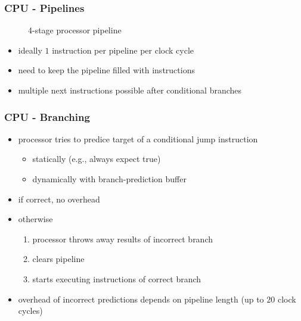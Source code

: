 \begin{frame}
 \frametitle{CPU - Pipelines}

 \begin{figure}
  \caption{4-stage processor pipeline}
 \end{figure}

 \begin{itemize}
  \item ideally \( 1 \) instruction per pipeline per clock cycle
  \item need to keep the pipeline filled with instructions
  \item multiple next instructions possible after conditional branches
 \end{itemize}
\end{frame}

\begin{frame}
 \frametitle{CPU - Branching}
 \begin{itemize}
  \item processor tries to predice target of a conditional jump instruction
   \begin{itemize}
    \item statically (e.g., always expect true)
    \item dynamically with branch-prediction buffer
   \end{itemize}
  \item if correct, no overhead
  \item otherwise
  \begin{enumerate}
   \item processor throws away results of incorrect branch
   \item clears pipeline
   \item starts executing instructions of correct branch
  \end{enumerate}
  \item overhead of incorrect predictions depends on pipeline length (up to \( 20 \) clock cycles)
 \end{itemize}
\end{frame}

